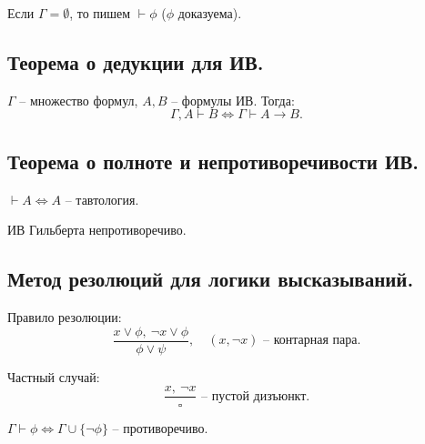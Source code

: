 \begin{remark}
    Если $ \Gamma = \emptyset $, то пишем $ \vdash \phi $ ($ \phi $ доказуема).
\end{remark}

\subsection{Теорема о дедукции для ИВ.}

\begin{theorem}
    $ \Gamma $ -- множество формул, $ A,B $ -- формулы ИВ. Тогда:
    \[
        \Gamma, A \vdash B \iff \Gamma \vdash A \rightarrow B.
    \]
\end{theorem}

\subsection{Теорема о полноте и непротиворечивости ИВ.}

\begin{theorem}[О полноте ИВ]
    $ \vdash A \iff A $ -- тавтология.
\end{theorem}

\begin{theorem}[О непротиворечивости ИВ]
    ИВ Гильберта непротиворечиво.
\end{theorem}

\subsection{Метод резолюций для логики высказываний.}

\begin{note}
    Правило резолюции:
    \[
        \frac{x \lor \phi, \ \lnot x \lor \phi}{\phi \lor \psi}, \quad (x,\lnot x)\text{ -- контарная пара}.
    \]

    Частный случай:
    \[
        \frac{x, \ \lnot x}{\square}\text{ -- пустой дизъюнкт}.
    \]
\end{note}

\begin{theorem}
    $ \Gamma \vdash \phi \iff \Gamma \cup \{\lnot \phi\} $ -- противоречиво.
\end{theorem}

